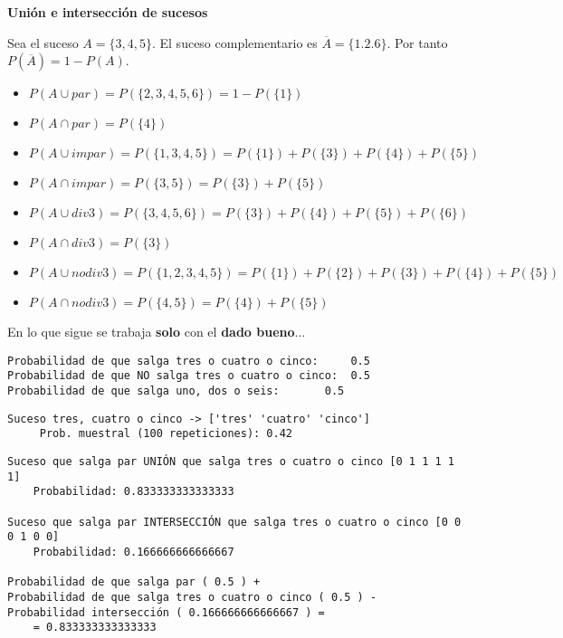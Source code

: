 \documentclass[11pt]{article}
\providecommand{\tightlist}{%
      \setlength{\itemsep}{0pt}\setlength{\parskip}{0pt}}
\begin{document}
    \textbf{Unión e intersección de sucesos}

Sea el suceso \(A=\{3,4,5\}\). El suceso complementario es
\(\overline A=\{1.2.6\}\). Por tanto \(P(\overline A) = 1-P(A)\).

\begin{itemize}
\tightlist
\item
  \(P(A\cup par)=P(\{2,3,4,5,6\})=1-P(\{1\})\)
\item
  \(P(A\cap par)=P(\{4\})\)
\item
  \(P(A\cup impar)=P(\{1,3,4,5\})=P(\{1\})+P(\{3\})+P(\{4\})+P(\{5\})\)
\item
  \(P(A\cap impar)=P(\{3,5\})=P(\{3\})+P(\{5\})\)
\item
  \(P(A\cup div3)=P(\{3,4,5,6\})=P(\{3\})+P(\{4\})+P(\{5\})+P(\{6\})\)
\item
  \(P(A\cap div3)=P(\{3\})\)
\item
  \(P(A\cup nodiv3)=P(\{1,2,3,4,5\})=P(\{1\})+P(\{2\})+P(\{3\})+P(\{4\})+P(\{5\})\)
\item
  \(P(A\cap nodiv3)=P(\{4,5\})=P(\{4\})+P(\{5\})\)
\end{itemize}

    En lo que sigue se trabaja \textbf{solo} con el \textbf{dado bueno}...

    \begin{Verbatim}[commandchars=\\\{\}]
Probabilidad de que salga tres o cuatro o cinco:	 0.5
Probabilidad de que NO salga tres o cuatro o cinco:	 0.5
Probabilidad de que salga uno, dos o seis:		 0.5

    \end{Verbatim}

    \begin{Verbatim}[commandchars=\\\{\}]
Suceso tres, cuatro o cinco -> ['tres' 'cuatro' 'cinco'] 
	 Prob. muestral (100 repeticiones): 0.42

    \end{Verbatim}

    \begin{Verbatim}[commandchars=\\\{\}]
Suceso que salga par UNIÓN que salga tres o cuatro o cinco [0 1 1 1 1 1] 
	Probabilidad: 0.833333333333333

Suceso que salga par INTERSECCIÓN que salga tres o cuatro o cinco [0 0 0 1 0 0] 
	Probabilidad: 0.166666666666667

Probabilidad de que salga par ( 0.5 ) + 
Probabilidad de que salga tres o cuatro o cinco ( 0.5 ) - 
Probabilidad intersección ( 0.166666666666667 ) = 
	= 0.833333333333333

    \end{Verbatim}
\end{document}
